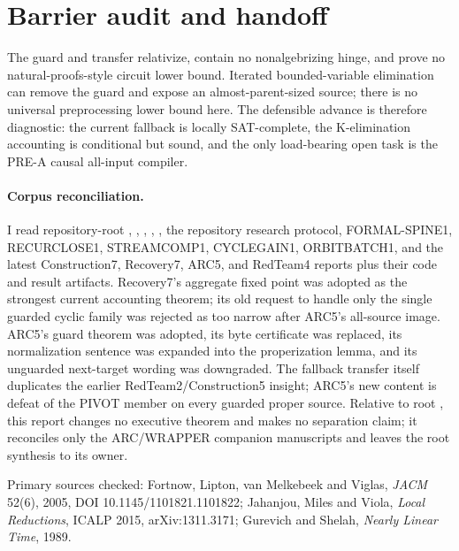 \documentclass[11pt]{article}
\begin{document}
\section{Barrier audit and handoff}
The guard and transfer relativize, contain no nonalgebrizing hinge, and prove
no natural-proofs-style circuit lower bound.  Iterated bounded-variable
elimination can remove the guard and expose an almost-parent-sized source;
there is no universal preprocessing lower bound here.  The defensible advance
is therefore diagnostic: the current fallback is locally SAT-complete, the
K-elimination accounting is conditional but sound, and the only load-bearing
open task is the PRE-A causal all-input compiler.

\paragraph{Corpus reconciliation.}
I read repository-root , , ,
, , the repository research protocol,
FORMAL-SPINE1, RECURCLOSE1, STREAMCOMP1, CYCLEGAIN1, ORBITBATCH1, and the
latest Construction7, Recovery7, ARC5, and RedTeam4 reports plus their code
and result artifacts.  Recovery7's aggregate fixed point was adopted as the
strongest current accounting theorem; its old request to handle only the
single guarded cyclic family was rejected as too narrow after ARC5's
all-source image.  ARC5's guard theorem was adopted, its byte certificate was
replaced, its normalization sentence was expanded into the properization
lemma, and its unguarded next-target wording was downgraded.  The fallback
transfer itself duplicates the earlier RedTeam2/Construction5 insight; ARC5's
new content is defeat of the PIVOT member on every guarded proper source.
Relative to root , this report changes no executive theorem and
makes no separation claim; it reconciles only the ARC/WRAPPER companion
manuscripts and leaves the root synthesis to its owner.

Primary sources checked: Fortnow, Lipton, van Melkebeek and Viglas,
\emph{JACM} 52(6), 2005, DOI 10.1145/1101821.1101822;
Jahanjou, Miles and Viola, \emph{Local Reductions}, ICALP 2015,
arXiv:1311.3171; Gurevich and Shelah, \emph{Nearly Linear Time}, 1989.

\end{document}
